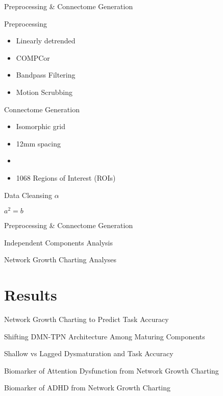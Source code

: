 \documentclass[presentation]{beamer}
\begin{document}
\begin{frame}[label={sec:orgheadline13}]{Preprocessing \& Connectome Generation}
\begin{block}{Preprocessing}
\begin{itemize}
\item Linearly detrended
\item COMPCor
\item Bandpass Filtering
\item Motion Scrubbing
\end{itemize}
\end{block}
\begin{block}{Connectome Generation}
\begin{itemize}
\item Isomorphic grid
\item 12mm spacing
\item 

\item 1068 Regions of Interest (ROIs)
\end{itemize}
\end{block}
\end{frame}
\begin{frame}[label={sec:orgheadline14}]{Data Cleansing}
\(\alpha\)

\(a^2=b\)
\end{frame}
\begin{frame}[label={sec:orgheadline15}]{Preprocessing \& Connectome Generation}
\end{frame}
\begin{frame}[label={sec:orgheadline16}]{Independent Components Analysis}
\end{frame}
\begin{frame}[label={sec:orgheadline17}]{Network Growth Charting Analyses}
\end{frame}
\section{Results}
\label{sec:orgheadline24}
\begin{frame}[label={sec:orgheadline19}]{Network Growth Charting to Predict Task Accuracy}
\end{frame}
\begin{frame}[label={sec:orgheadline20}]{Shifting DMN-TPN Architecture Among Maturing Components}
\end{frame}
\begin{frame}[label={sec:orgheadline21}]{Shallow vs Lagged Dysmaturation and Task Accuracy}
\end{frame}
\begin{frame}[label={sec:orgheadline22}]{Biomarker of Attention Dysfunction from Network Growth Charting}
\end{frame}
\begin{frame}[label={sec:orgheadline23}]{Biomarker of ADHD from Network Growth Charting}
\end{frame}
\end{document}

